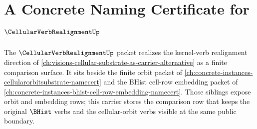 \chapter{A Concrete Naming Certificate for $\CellularVerbRealignmentUp$}
\label{ch:concrete-instances-cellular-verb-realignment-namecert}

The $\CellularVerbRealignmentUp$ packet realizes the kernel-verb realignment direction of \autoref{ch:visions-cellular-substrate-as-carrier-alternative} as a finite comparison surface. It sits beside the finite orbit packet of \autoref{ch:concrete-instances-cellularorbitsubstrate-namecert} and the BHist cell-row embedding packet of \autoref{ch:concrete-instances-bhist-cell-row-embedding-namecert}. Those siblings expose orbit and embedding rows; this carrier stores the comparison row that keeps the original $\BHist$ verbs and the cellular-orbit verbs visible at the same public boundary.



